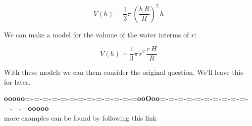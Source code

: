 \documentclass{ximera}
\begin{document}
\[  V(h) = \frac{1}{3}  \pi \, \left( \frac{h \, R}{H} \right)^2 \, h    \]



We can make a model for the volume of the water interms of $r$:

\[  V(h) = \frac{1}{3}  \pi \, r^2 \, \frac{r \, H}{R}    \]





With these models we can them consider the original question.  We'll leave this for later.













\begin{center}
\textbf{\textcolor{green!50!black}{ooooo=-=-=-=-=-=-=-=-=-=-=-=-=ooOoo=-=-=-=-=-=-=-=-=-=-=-=-=ooooo}} \\

more examples can be found by following this link\\ 

\end{center}
\end{document}
